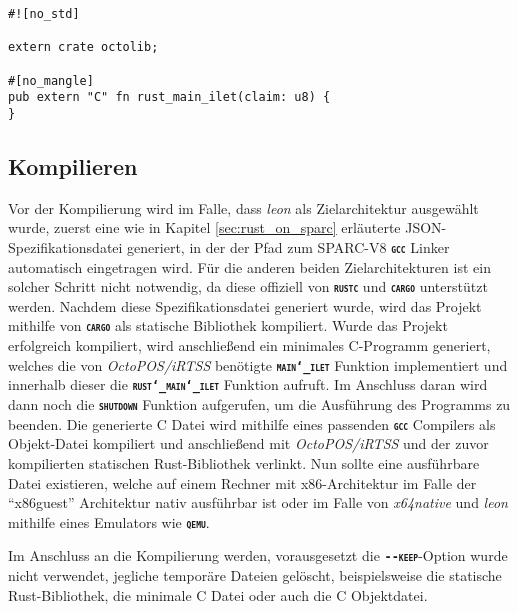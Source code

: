\begin{lstlisting}[float,caption={
Eine minimale Haupt-Quelldatei eines invasiven \textit{Cargo}-Projekts
},label=code:minimal_cargo_source]
#![no_std]

extern crate octolib;

#[no_mangle]
pub extern "C" fn rust_main_ilet(claim: u8) {
}
\end{lstlisting}

\subsection{Kompilieren}

Vor der Kompilierung wird im Falle, dass \textit{leon} als Zielarchitektur ausgewählt wurde,
zuerst eine wie in Kapitel \ref{sec:rust_on_sparc} erläuterte
JSON-Spezifikationsdatei generiert,
in der der Pfad zum SPARC-V8 \texttt{\textsc{\textbf{gcc}}} Linker automatisch eingetragen wird.
Für die anderen beiden Zielarchitekturen ist ein solcher Schritt nicht notwendig,
da diese offiziell von \texttt{\textsc{\textbf{rustc}}} und \texttt{\textsc{\textbf{cargo}}} unterstützt werden. 
Nachdem diese Spezifikationsdatei generiert wurde, wird das Projekt mithilfe von \texttt{\textsc{\textbf{cargo}}}
als statische Bibliothek kompiliert.
Wurde das Projekt erfolgreich kompiliert, wird anschließend ein minimales C-Programm generiert,
welches die von \textit{OctoPOS/iRTSS} benötigte \texttt{\textsc{\textbf{main\char`_ilet}}} Funktion implementiert
und innerhalb dieser die \texttt{\textsc{\textbf{rust\char`_main\char`_ilet}}} Funktion aufruft.
Im Anschluss daran wird dann noch die \texttt{\textsc{\textbf{shutdown}}} Funktion aufgerufen, um die 
Ausführung des Programms zu beenden. Die generierte C Datei wird mithilfe eines passenden
\texttt{\textsc{\textbf{gcc}}} Compilers als Objekt-Datei kompiliert
und anschließend mit \textit{OctoPOS/iRTSS} und der zuvor kompilierten statischen Rust-Bibliothek verlinkt.
Nun sollte eine ausführbare Datei existieren, welche auf einem Rechner mit x86-Architektur im Falle der "`x86guest"' 
Architektur nativ ausführbar ist oder im Falle von \textit{x64native} und \textit{leon} mithilfe eines Emulators wie 
\texttt{\textsc{\textbf{qemu}}}.

Im Anschluss an die Kompilierung werden,
vorausgesetzt die \texttt{\textsc{\textbf{-{}-keep}}}-Option wurde nicht verwendet,
jegliche temporäre Dateien gelöscht, beispielsweise die statische Rust-Bibliothek,
die minimale C Datei oder auch die C Objektdatei.

